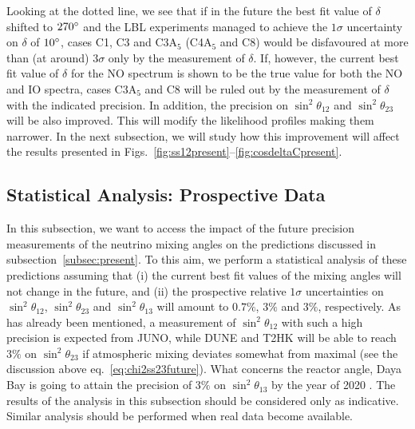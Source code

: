 \documentclass[11pt,a4paper]{article}
\def\th{\theta}
\numberwithin{equation}{section}
\begin{document}
 Looking at the dotted line, we see that if in the future 
the best fit value of $\delta$ 
shifted to $270\degree$ and the LBL experiments managed to achieve 
the $1\sigma$ uncertainty on $\delta$ of $10\degree$, 
cases C1, C3 and C3A$_5$ (C4A$_5$ and C8) would 
be disfavoured at more than (at around) 
$3\sigma$ only by the measurement of $\delta$.
If, however, the current best fit value of $\delta$ for the NO spectrum 
is shown to be the true value for both the NO and IO spectra,
cases  C3A$_5$ and C8 will be ruled out 
by the measurement of $\delta$ with the indicated precision.
In addition, the precision on $\sin^2\th_{12}$ and $\sin^2\th_{23}$ 
will be also improved. 
This will modify the likelihood profiles making them narrower.
In the next subsection, we will study how this improvement will affect the results 
presented in Figs.~\ref{fig:ss12present}--\ref{fig:cosdeltaCpresent}.


\subsection{Statistical Analysis: Prospective Data}
\label{subsec:future}

 In this subsection, we want to access the impact of the 
future precision measurements 
of the neutrino mixing angles on the predictions discussed 
in subsection~\ref{subsec:present}.
To this aim, we perform a statistical analysis of these 
predictions assuming that 
(i) the current best fit values of the mixing angles 
will not change in the future, 
and (ii) the prospective relative $1\sigma$ uncertainties on 
$\sin^2\th_{12}$, $\sin^2\th_{23}$ and $\sin^2\th_{13}$ 
will amount to $0.7\%$, $3\%$ and $3\%$, respectively.
As has already been mentioned, a measurement of $\sin^2\th_{12}$ 
with such a high precision is expected from JUNO, while DUNE and T2HK 
will be able to reach $3\%$ on $\sin^2\th_{23}$ if atmospheric mixing 
deviates somewhat from maximal 
(see the discussion above eq.~\eqref{eq:chi2ss23future}).
What concerns the reactor angle, 
Daya Bay is going to attain the precision of $3\%$ on $\sin^2\th_{13}$ 
by the year of 2020 \cite{Ling:2016wgq}.
The results of the analysis in this subsection should be considered only as indicative. 
Similar analysis should be performed when real data become available.
 
\end{document}

